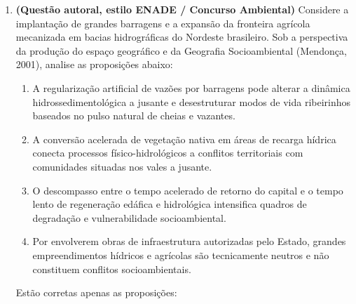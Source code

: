 \begin{enumerate}[leftmargin=1.8em, itemsep=5pt, start=16]
  \item \textbf{(Questão autoral, estilo ENADE / Concurso Ambiental)} Considere a implantação de grandes barragens e a expansão da fronteira agrícola mecanizada em bacias hidrográficas do Nordeste brasileiro. Sob a perspectiva da produção do espaço geográfico e da Geografia Socioambiental (Mendonça, 2001), analise as proposições abaixo:
  \begin{enumerate}[label=\Roman*., leftmargin=1.6em, itemsep=1.5pt]
    \item A regularização artificial de vazões por barragens pode alterar a dinâmica hidrossedimentológica a jusante e desestruturar modos de vida ribeirinhos baseados no pulso natural de cheias e vazantes.
    \item A conversão acelerada de vegetação nativa em áreas de recarga hídrica conecta processos físico-hidrológicos a conflitos territoriais com comunidades situadas nos vales a jusante.
    \item O descompasso entre o tempo acelerado de retorno do capital e o tempo lento de regeneração edáfica e hidrológica intensifica quadros de degradação e vulnerabilidade socioambiental.
    \item Por envolverem obras de infraestrutura autorizadas pelo Estado, grandes empreendimentos hídricos e agrícolas são tecnicamente neutros e não constituem conflitos socioambientais.
  \end{enumerate}
  Estão corretas apenas as proposições:
  \espacoResolucao[1.8cm]


\end{enumerate}
